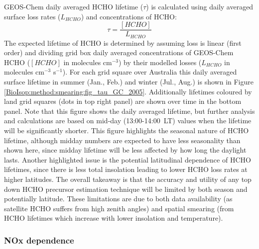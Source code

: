       GEOS-Chem daily averaged HCHO lifetime ($\tau$) is calculated using daily averaged surface loss rates ($L_{HCHO}$) and concentrations of HCHO:
      \begin{equation*}
      \tau = \frac{[HCHO]}{L_{HCHO}}
      \end{equation*}
      The expected lifetime of HCHO is determined by assuming loss is linear (first order) and dividing grid box daily averaged concentrations of GEOS-Chem HCHO ($[HCHO]$ in molecules cm$^{-3}$) by their modelled losses ($L_{HCHO}$ in molecules cm$^{-3}$ s$^{-1}$).
      For each grid square over Australia this daily averaged surface lifetime in summer (Jan., Feb.) and winter (Jul., Aug.) is shown in Figure \ref{BioIsop:method:smearing:fig_tau_GC_2005}.
      Additionally lifetimes coloured by land grid squares (dots in top right panel) are shown over time in the bottom panel.
      Note that this figure shows the daily averaged lifetime, but further analysis and calculations are based on mid-day (13:00-14:00~LT) values when the lifetime will be significantly shorter. 
      This figure highlights the seasonal nature of HCHO lifetime, although midday numbers are expected to have less seasonality than shown here, since midday lifetime will be less affected by how long the daylight lasts.
      Another highlighted issue is the potential latitudinal dependence of HCHO lifetimes, since there is less total insolation leading to lower HCHO loss rates at higher latitudes.
      The overall takeaway is that the accuracy and utility of any top down HCHO precursor estimation technique will be limited by both season and potentially latitude.
      These limitations are due to both data availability (as satellite HCHO suffers from high zenith angles) and spatial smearing (from HCHO lifetimes which increase with lower insolation and temperature).
      
      
    
    \subsubsection{NOx dependence}
      
